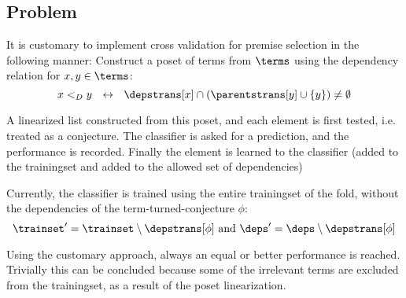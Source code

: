 \subsection{Problem}
It is customary to implement cross validation for premise selection in the following manner:
Construct a poset of terms from $\terms$ using the dependency relation for $x, y \in \terms$:
\[
	x <_D y ~~\leftrightarrow~~ \depstrans[x] \cap (\parentstrans[y] \cup \{y\}) \neq \emptyset
\]

A linearized list constructed from this poset, and each element is
	first tested, i.e. treated as a conjecture.
	The classifier is asked for a prediction, and the performance is recorded.
	Finally the element is learned to the classifier (added to the trainingset and added to the allowed set of dependencies)

Currently, the classifier is trained using the entire trainingset of the fold, without the dependencies of the term-turned-conjecture $\phi$:
\[
	\trainset' = \trainset \setminus \depstrans[\phi] ~\text{and}~ \deps' = \deps \setminus \depstrans[\phi]
\]

Using the customary approach, always an equal or better performance is reached.
Trivially this can be concluded because some of the irrelevant terms are excluded from the trainingset, as a result of the poset linearization.
